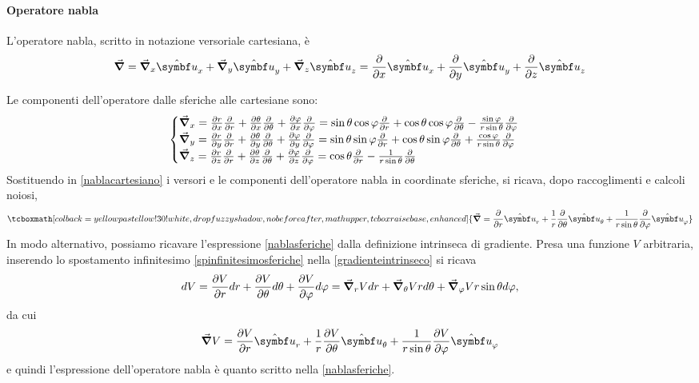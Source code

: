 \paragraph{Operatore nabla}
\begin{remember}
	L'operatore nabla, scritto in notazione versoriale cartesiana, è
	\begin{equation*}
		\grad =\grad_x\vbh{u}_x+\grad_y\vbh{u}_y+\grad_z\vbh{u}_z=\pdv{x}\vbh{u}_x+\pdv{y}\vbh{u}_y+\pdv{z}\vbh{u}_z
	\end{equation*}
\end{remember}
Le componenti dell'operatore dalle sferiche alle cartesiane sono:
\begin{equation}
	\begin{cases}
		\grad_x=\pdv{r}{x}\pdv{r}+\pdv{\theta}{x}\pdv{\theta}+\pdv{\varphi}{x}\pdv{\varphi}=\sin\theta\cos\varphi\pdv{r}+\cos\theta\cos\varphi\pdv{\theta}-\frac{\sin\varphi}{r\sin\theta}\pdv{\varphi}\\
		\grad_y=\pdv{r}{y}\pdv{r}+\pdv{\theta}{y}\pdv{\theta}+\pdv{\varphi}{y}\pdv{\varphi}=\sin\theta\sin\varphi\pdv{r}+\cos\theta\sin\varphi\pdv{\theta}+\frac{\cos\varphi}{r\sin\theta}\pdv{\varphi}\\
		\grad_z=\pdv{r}{z}\pdv{r}+\pdv{\theta}{z}\pdv{\theta}+\pdv{\varphi}{z}\pdv{\varphi}=\cos\theta\pdv{r}-\frac{1}{r\sin\theta}\pdv{\theta}\end{cases}
\end{equation}
Sostituendo in \ref{nablacartesiano} i versori e le componenti dell'operatore nabla in coordinate sferiche, si ricava, dopo raccoglimenti e calcoli noiosi,
\begin{equation}
	\tcboxmath[colback=yellowpastellow!30!white,drop fuzzy shadow, nobeforeafter, math upper, tcbox raise base, enhanced]{\grad=\pdv{r}\vbh{u}_r+\frac{1}{r}\pdv{\theta}\vbh{u}_\theta+\frac{1}{r\sin\theta}\pdv{\phi}\vbh{u}_\phi}\label{nablasferiche}
\end{equation}
In modo alternativo, possiamo ricavare l'espressione \ref{nablasferiche} dalla definizione intrinseca di gradiente. Presa una funzione $V$ arbitraria, inserendo lo spostamento infinitesimo \ref{spinfinitesimosferiche} nella \ref{gradienteintrinseco} si ricava
\begin{equation*}
	dV=\pdv{V}{r}dr+\pdv{V}{\theta}d\theta+\pdv{V}{\varphi}d\varphi=\grad_r{V}dr+\grad_\theta{V}rd\theta+\grad_\varphi{V}r\sin\theta d\varphi,
\end{equation*}
da cui
\begin{equation}
	\grad{V}=\pdv{V}{r}\vbh{u}_r+\frac{1}{r}\pdv{V}{\theta}\vbh{u}_\theta+\frac{1}{r\sin\theta}\pdv{V}{\phi}\vbh{u}_\phi
\end{equation}
e quindi l'espressione dell'operatore nabla è quanto scritto nella \ref{nablasferiche}.
